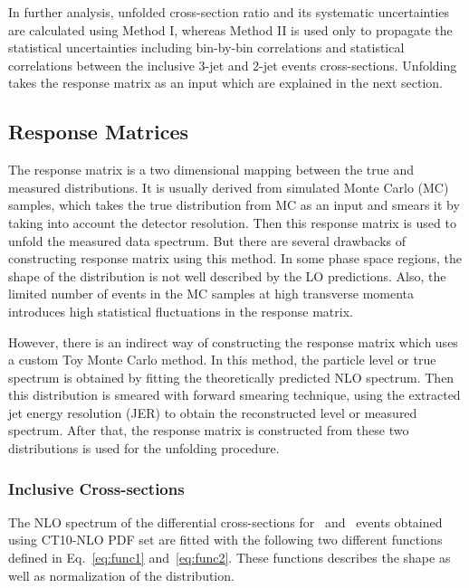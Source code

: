 In further analysis, unfolded cross-section ratio \ratio and its systematic uncertainties are calculated using Method I, whereas Method II is used only to propagate the statistical uncertainties including bin-by-bin correlations and statistical correlations between the inclusive 3-jet and 2-jet events cross-sections. Unfolding takes the response matrix as an input which are explained in the next section.

\subsection{Response Matrices}
\label{sec:funcs}
The response matrix is a two dimensional mapping between the true and measured distributions. It is usually derived from simulated Monte Carlo (MC) samples, which takes the true distribution from MC as an input and smears it by taking into account the detector resolution. Then this response matrix is used to unfold the measured data spectrum. But there are several drawbacks of constructing response matrix using this method. In some phase space regions, the shape of the distribution is not well described by the LO predictions. Also, the limited number of events in the MC samples at high transverse momenta introduces high statistical fluctuations in the response matrix. 

However, there is an indirect way of constructing the response matrix which uses a custom Toy Monte Carlo method. In this method, the particle level or true \httwo spectrum is obtained by fitting the theoretically predicted NLO spectrum. Then this distribution is smeared with forward smearing technique, using the extracted jet energy resolution (JER) to obtain the reconstructed level or measured \httwo spectrum. After that, the response matrix is constructed from these two distributions is used for the unfolding procedure. 

\subsubsection{Inclusive Cross-sections}
\label{sec:cross_sec_res}
The NLO spectrum of the differential cross-sections for \njt~and \njth~events obtained using CT10-NLO PDF set are fitted with the following two different functions defined in Eq.~\ref{eq:func1} and~\ref{eq:func2}. These functions describes the shape as well as normalization of the distribution.  

